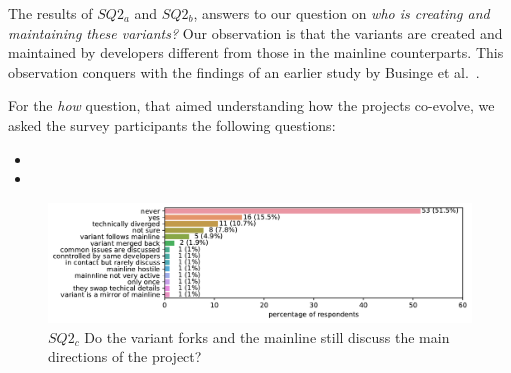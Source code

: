 The results of $SQ2_{a}$ and $SQ2_{b}$, answers to our question on \textit{who is creating and maintaining these variants?} Our observation is that the variants are created and maintained by developers different from those in the mainline counterparts. This observation conquers with the findings of an earlier study by Businge et al.~\cite{businge:emse:2021}.


For the \textit{how} question, that aimed understanding how the projects co-evolve, we asked the survey participants the following questions:
\begin{itemize}
\item \rqTwoThree
\item   \rqTwoFour
\end{itemize}


\begin{figure}[ht]
\begin{center}
    \centering
    \includegraphics[width=\columnwidth]{pdfs/discussions_rq3_colored.pdf}
    \caption{$SQ2_{c}$ Do the variant forks and the mainline still discuss the main directions of the project?}
    \label{fig:discussions}
\end{center}
\vspace{-.3cm}
\end{figure}


